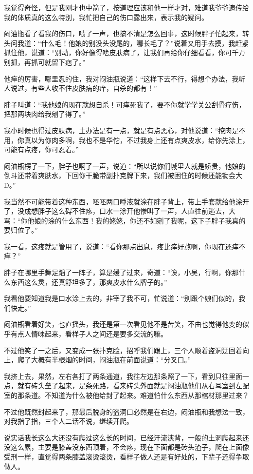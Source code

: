 我觉得奇怪，但是我刚才也中箭了，按道理应该和他一样才对，难道我爷爷遗传给我的体质真的这么特别，我忙把自己的伤口露出来，表示我的疑问。

闷油瓶看了看我的伤口，啧了一声，也搞不清是怎么回事，这时候胖子怕起来，转头问我道：“什么毛！他娘的别没头没尾的，哪长毛了？”说着又用手去摸，我赶紧抓住他，说道：“别动，你好像得啥皮肤病了，让我们再给你仔细看看，你可千万别抓，再抓可就留下疤了。”

他痒的厉害，哪里忍的住，我对闷油瓶说道：“这样下去不行，得想个办法，我听人说过，有些人收不住皮肤病的痒，自杀的都有！”

胖子叫道：“我他娘的现在就想自杀！可痒死我了，要不你就学学关公刮骨疗伤，把那两块肉给我剜了得了。”

我小时候也得过皮肤病，土办法是有一点，就是有点恶心，对他说道：“挖肉是不用，你真以为你肉多啊，我也不是华佗，不过我身上还有点爽皮水，给你先涂上，可能有点疼，你可忍着。”

闷油瓶楞了一下，胖子也啊了一声，说道：“所以说你们城里人就是娇贵，他娘的倒斗还带着爽肤水，下回你干脆带副扑克牌下来，我们被困住的时候还能锄会大D。”

我当然不可能带着这种东西，呸呸两口唾液就涂在胖子背上，带上手套就给他涂开了，没成想胖子这么碍不住疼，口水一涂开他惨叫了一声，人直往前逃去，大骂：“你他娘的涂的什么东西！我的姥姥，你还不如剜了我呢，这下子胖子我真的要归位了。”

我一看，这疼就是管用了，说道：“看你那点出息，疼比痒好熬啊，你现在还痒不痒？”

胖子在哪里手舞足蹈了一阵子，算是缓了过来，奇道：“诶，小吴，行啊，你那什么东西这么灵，还真舒坦多了，那爽皮水什么牌子的。”

我看他要知道我是口水涂上去的，非宰了我不可，忙说道：“别跟个娘们似的，我们快走。”

闷油瓶看着好笑，也直摇头，我还是第一次看见他不是苦笑，不由也觉得他变的似乎有点人情味起来，看样子人之间还是要多交流的嘛。

不过他笑了一之后，又变成一张扑克脸，招呼我们跟上，三个人顺着盗洞迂回着向上，爬了大概有半根烟的时间，闷油瓶在前面说道：“分叉口。”

我挤上去，果然，左右各打了两条通道，我往左边那条照了一下，看到只往里面一点，就有砖头垒了起来，是条死路，看来砖头外面就是闷油瓶他们从右耳室到左配室的那条道。不知道为什么被他给封了起来。难道怕什么东西从那棺材那里过来？

不过他既然封起来了，那最后脱身的盗洞口必然是在右边，闷油瓶和我想法一致，对我指了指，三个人二话不说，继续开爬。

说实话我长这么大还没有爬过这么长的时间，已经汗流浃背，一般的土洞爬起来还没这么累，主要是膝盖没东西顶着，不会疼，现在下面都是砖头渣子，爬在上面像受刑一样，直觉得两条膝盖滚烫滚烫，看样子做人还是有好处的，下辈子还得争取做人。

